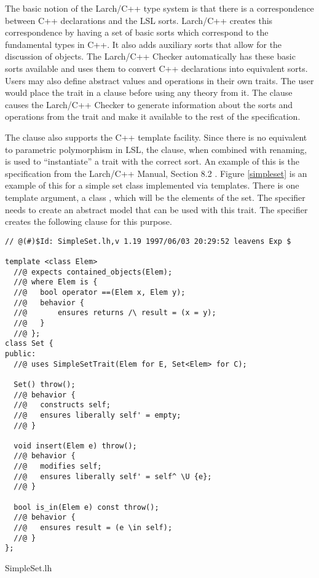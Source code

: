 The basic notion of the Larch/C++ type system is that there is a
correspondence between C++ declarations and the LSL sorts. Larch/C++
creates this correspondence by having a set of basic sorts which correspond to
the fundamental types in C++. It also adds auxiliary sorts that allow
for the discussion of objects. The Larch/C++ Checker automatically has
these basic sorts available and uses them to convert C++ declarations
into equivalent sorts. Users may also define abstract values and
operations in their own traits. The user would place the trait in a
 clause before using any theory from it. The
 clause causes the Larch/C++ Checker to generate
information about the sorts and operations from the trait and make it
available to the rest of the specification.

The  clause also supports the C++ template
facility. Since there is no equivalent to parametric polymorphism in
LSL, the  clause, when combined with renaming, is used
to ``instantiate'' a trait with the correct sort. An example of this
is the  specification from the Larch/C++ Manual, Section 8.2
\cite{Leavens96c}. Figure \ref{simpleset} is an example of this 
for a simple set class implemented via templates. There is one
template argument, a class , which will be the elements
of the set. The specifier needs to create an abstract model that can
be used with this trait. The specifier creates the following
 clause for this purpose.


\begin{BFIGURE}
\begin{verbatim}
// @(#)$Id: SimpleSet.lh,v 1.19 1997/06/03 20:29:52 leavens Exp $

template <class Elem>
  //@ expects contained_objects(Elem);
  //@ where Elem is {
  //@   bool operator ==(Elem x, Elem y);
  //@   behavior {
  //@       ensures returns /\ result = (x = y);
  //@   }
  //@ };
class Set {
public:
  //@ uses SimpleSetTrait(Elem for E, Set<Elem> for C);

  Set() throw();
  //@ behavior {
  //@   constructs self;
  //@   ensures liberally self' = empty;
  //@ }

  void insert(Elem e) throw();
  //@ behavior {
  //@   modifies self;
  //@   ensures liberally self' = self^ \U {e};
  //@ }

  bool is_in(Elem e) const throw();
  //@ behavior {
  //@   ensures result = (e \in self);
  //@ }
};
\end{verbatim}
\caption{SimpleSet.lh}
\label{simpleset}
\end{BFIGURE}


